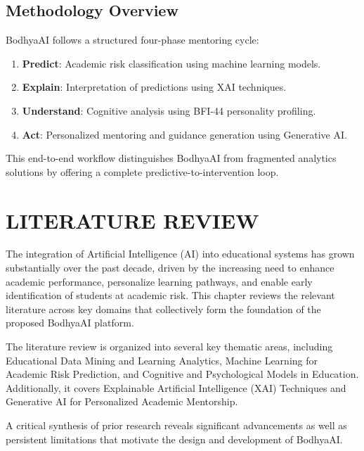 \documentclass[12pt,a4paper]{report}
\begin{document}
\section{Methodology Overview}

BodhyaAI follows a structured four-phase mentoring cycle:
\begin{enumerate}
    \item \textbf{Predict}: Academic risk classification using machine learning models.
    \item \textbf{Explain}: Interpretation of predictions using XAI techniques.
    \item \textbf{Understand}: Cognitive analysis using BFI-44 personality profiling.
    \item \textbf{Act}: Personalized mentoring and guidance generation using Generative AI.
\end{enumerate}

This end-to-end workflow distinguishes BodhyaAI from fragmented analytics solutions by offering a complete predictive-to-intervention loop.



\chapter{LITERATURE REVIEW}\label{Litreview}

The integration of Artificial Intelligence (AI) into educational systems has grown substantially over the past decade, driven by the increasing need to enhance academic performance, personalize learning pathways, and enable early identification of students at academic risk. This chapter reviews the relevant literature across key domains that collectively form the foundation of the proposed BodhyaAI platform.

The literature review is organized into several key thematic areas, including Educational Data Mining and Learning Analytics, Machine Learning for Academic Risk Prediction, and Cognitive and Psychological Models in Education. Additionally, it covers Explainable Artificial Intelligence (XAI) Techniques and Generative AI for Personalized Academic Mentorship.

A critical synthesis of prior research reveals significant advancements as well as persistent limitations that motivate the design and development of BodhyaAI.

\end{document}

